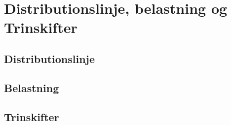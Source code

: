 
\section{Distributionslinje, belastning og Trinskifter}


\subsection{Distributionslinje}

\subsection{Belastning}

\subsection{Trinskifter}